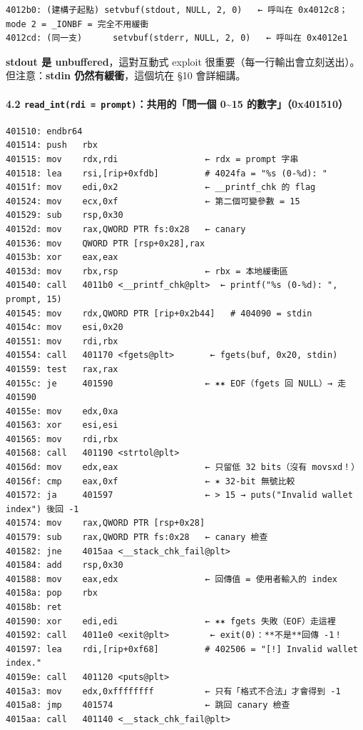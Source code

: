 \documentclass[10pt,a4paper]{article}
\begin{document}
\begin{Verbatim}[breaklines=true,breakanywhere=true,breakautoindent=false,fontsize=\fontsize{7.0}{9.5}\selectfont]
4012b0: (建構子起點) setvbuf(stdout, NULL, 2, 0)   ← 呼叫在 0x4012c8；mode 2 = _IONBF = 完全不用緩衝
4012cd: (同一支)      setvbuf(stderr, NULL, 2, 0)   ← 呼叫在 0x4012e1
\end{Verbatim}

\textbf{stdout 是 unbuffered}，這對互動式 exploit
很重要（每一行輸出會立刻送出）。 但注意：\textbf{stdin
仍然有緩衝}，這個坑在 §10 會詳細講。

\paragraph{\texorpdfstring{4.2
\texttt{read\_\allowbreak{}int(rdi\ \allowbreak{}=\ \allowbreak{}prompt)}：共用的「問一個 0\textasciitilde15
的數字」（0x401510）}{4.2 read\_int(rdi = prompt)：共用的「問一個 0\textasciitilde15 的數字」（0x401510）}}\label{read_intrdi-promptux5171ux7528ux7684ux554fux4e00ux500b-015-ux7684ux6578ux5b570x401510}

\begin{Verbatim}[breaklines=true,breakanywhere=true,breakautoindent=false,fontsize=\fontsize{7.0}{9.5}\selectfont]
401510: endbr64
401514: push   rbx
401515: mov    rdx,rdi                 ← rdx = prompt 字串
401518: lea    rsi,[rip+0xfdb]         # 4024fa = "%s (0-%d): "
40151f: mov    edi,0x2                 ← __printf_chk 的 flag
401524: mov    ecx,0xf                 ← 第二個可變參數 = 15
401529: sub    rsp,0x30
40152d: mov    rax,QWORD PTR fs:0x28   ← canary
401536: mov    QWORD PTR [rsp+0x28],rax
40153b: xor    eax,eax
40153d: mov    rbx,rsp                 ← rbx = 本地緩衝區
401540: call   4011b0 <__printf_chk@plt>  ← printf("%s (0-%d): ", prompt, 15)
401545: mov    rdx,QWORD PTR [rip+0x2b44]   # 404090 = stdin
40154c: mov    esi,0x20
401551: mov    rdi,rbx
401554: call   401170 <fgets@plt>       ← fgets(buf, 0x20, stdin)
401559: test   rax,rax
40155c: je     401590                  ← ✶✶ EOF（fgets 回 NULL）→ 走 401590
40155e: mov    edx,0xa
401563: xor    esi,esi
401565: mov    rdi,rbx
401568: call   401190 <strtol@plt>
40156d: mov    edx,eax                 ← 只留低 32 bits（沒有 movsxd！）
40156f: cmp    eax,0xf                 ← ✶ 32-bit 無號比較
401572: ja     401597                  ← > 15 → puts("Invalid wallet index") 後回 -1
401574: mov    rax,QWORD PTR [rsp+0x28]
401579: sub    rax,QWORD PTR fs:0x28   ← canary 檢查
401582: jne    4015aa <__stack_chk_fail@plt>
401584: add    rsp,0x30
401588: mov    eax,edx                 ← 回傳值 = 使用者輸入的 index
40158a: pop    rbx
40158b: ret
401590: xor    edi,edi                 ← ✶✶ fgets 失敗（EOF）走這裡
401592: call   4011e0 <exit@plt>        ← exit(0)：**不是**回傳 -1！
401597: lea    rdi,[rip+0xf68]         # 402506 = "[!] Invalid wallet index."
40159e: call   401120 <puts@plt>
4015a3: mov    edx,0xffffffff          ← 只有「格式不合法」才會得到 -1
4015a8: jmp    401574                  ← 跳回 canary 檢查
4015aa: call   401140 <__stack_chk_fail@plt>
\end{Verbatim}
\end{document}

